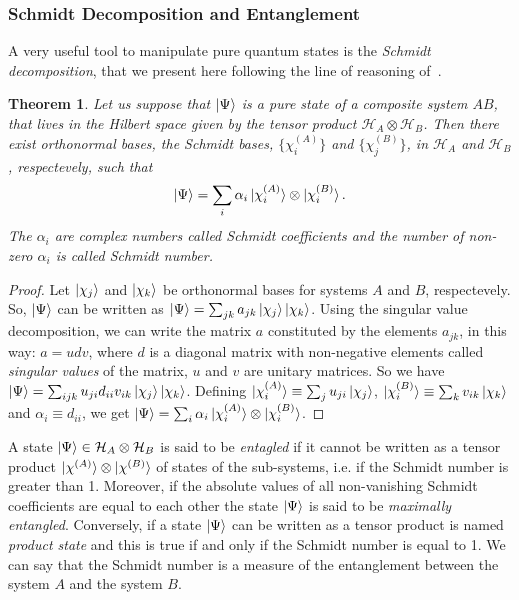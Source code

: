 \subsubsection{Schmidt Decomposition and Entanglement}
A very useful tool to manipulate pure quantum states is the \emph{Schmidt decomposition}, that we present here following the line of reasoning of~\cite{nielsen_chuang}.
\newtheorem{theo}{Theorem}[section]
\begin{theo}
    Let us suppose that $\ket{\Psi}$ is a pure state of a composite system $AB$, that lives in the Hilbert space given by the tensor product $\mathcal{H}_A \otimes \mathcal{H}_B$. Then there exist orthonormal bases, the Schmidt bases, $\{\chi_i^{(A)}\}$ and $\{\chi_j^{(B)}\}$, in $\mathcal{H}_A$ and $\mathcal{H}_B$, respectevely, such that
    \begin{equation}
        \ket{\Psi} = \sum_i \alpha_i \ket{\chi_i^{(A)}}\otimes \ket{\chi_i^{(B)}}.
    \end{equation}
    The $\alpha_i$ are complex numbers called Schmidt coefficients and the number of non-zero $\alpha_i$ is called Schmidt number.
\end{theo}
\begin{proof}
Let $\ket{\chi_j}$ and $\ket{\chi_k}$ be orthonormal bases for systems $A$ and $B$, respectevely. So, $\ket{\Psi}$ can be written as $\ket{\Psi} = \sum_{jk} a_{jk}\ket{\chi_j}\ket{\chi_k}$. Using the singular value decomposition, we can write the matrix $a$ constituted by the elements $a_{jk}$, in this way: $a = udv$, where $d$ is a diagonal matrix with non-negative elements called \emph{singular values} of the matrix, $u$ and $v$ are unitary matrices. So we have $\ket{\Psi} = \sum_{ijk} u_{ji}d_{ii}v_{ik} \ket{\chi_j}\ket{\chi_k}$.
Defining $\ket{\chi_i^{(A)}} \equiv \sum_j u_{ji}\ket{\chi_j}$, $\ket{\chi_i^{(B)}} \equiv \sum_k v_{ik}\ket{\chi_k}$ and $\alpha_i \equiv d_{ii}$, we get $\ket{\Psi} = \sum_i \alpha_i \ket{\chi_i^{(A)}}\otimes \ket{\chi_i^{(B)}}$.
\end{proof}

A state $\ket{\Psi} \in \mathcal{H}_A \otimes \mathcal{H}_B$ is said to be \emph{entagled} if it cannot be written as a tensor product $\ket{\chi^{(A)}}\otimes \ket{\chi^{(B)}}$ of states of the sub-systems, i.e. if the Schmidt number is greater than 1. Moreover, if the absolute values of all non-vanishing Schmidt coefficients are equal to each other the state $\ket{\Psi}$ is said to be \emph{maximally entangled}. Conversely, if a state $\ket{\Psi}$ can be written as a tensor product is named \emph{product state} and this is true if and only if the Schmidt number is equal to 1. We can say that the Schmidt number is a measure of the entanglement between the system $A$ and the system $B$.

